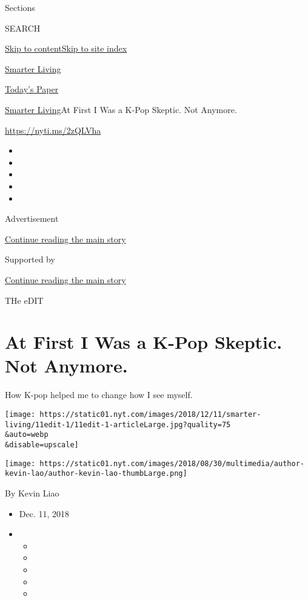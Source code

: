 Sections

SEARCH

\protect\hyperlink{site-content}{Skip to
content}\protect\hyperlink{site-index}{Skip to site index}

\href{https://www.nytimes.com/section/smarter-living}{Smarter Living}

\href{https://myaccount.nytimes.com/auth/login?response_type=cookie\&client_id=vi}{}

\href{https://www.nytimes.com/section/todayspaper}{Today's Paper}

\href{/section/smarter-living}{Smarter Living}\textbar{}At First I Was a
K-Pop Skeptic. Not Anymore.

\url{https://nyti.ms/2zQLVha}

\begin{itemize}
\item
\item
\item
\item
\item
\end{itemize}

Advertisement

\protect\hyperlink{after-top}{Continue reading the main story}

Supported by

\protect\hyperlink{after-sponsor}{Continue reading the main story}

THe eDIT

\hypertarget{at-first-i-was-a-k-pop-skeptic-not-anymore}{%
\section{At First I Was a K-Pop Skeptic. Not
Anymore.}\label{at-first-i-was-a-k-pop-skeptic-not-anymore}}

How K-pop helped me to change how I see myself.

\texttt{[image: https://static01.nyt.com/images/2018/12/11/smarter-living/11edit-1/11edit-1-articleLarge.jpg?quality=75\\\&auto=webp\\\&disable=upscale]}

\texttt{[image: https://static01.nyt.com/images/2018/08/30/multimedia/author-kevin-lao/author-kevin-lao-thumbLarge.png]}

By Kevin Liao

\begin{itemize}
\item
  Dec. 11, 2018
\item
  \begin{itemize}
  \item
  \item
  \item
  \item
  \item
  \end{itemize}
\end{itemize}

